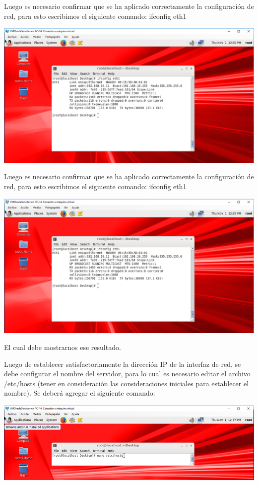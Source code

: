 \vspace{\baselineskip}

Luego es necesario confirmar que se ha aplicado correctamente la configuración de red, para esto escribimos el siguiente comando: ifconfig eth1
\begin{center}
	\includegraphics[width=17cm]{./Imagenes/49} 
\end{center} 

\vspace{\baselineskip}

Luego es necesario confirmar que se ha aplicado correctamente la configuración de red, para esto escribimos el siguiente comando: ifconfig eth1
\begin{center}
	\includegraphics[width=17cm]{./Imagenes/49} 
\end{center} 
El cual debe mostrarnos ese resultado.

\newpage

Luego de establecer satisfactoriamente la dirección IP de la interfaz de red, se debe configurar el nombre del servidor, para lo cual es necesario editar el archivo /etc/hosts (tener en consideración las consideraciones iniciales para establecer el nombre). Se deberá agregar el siguiente comando:
\begin{center}
	\includegraphics[width=17cm]{./Imagenes/50} 
\end{center} 

